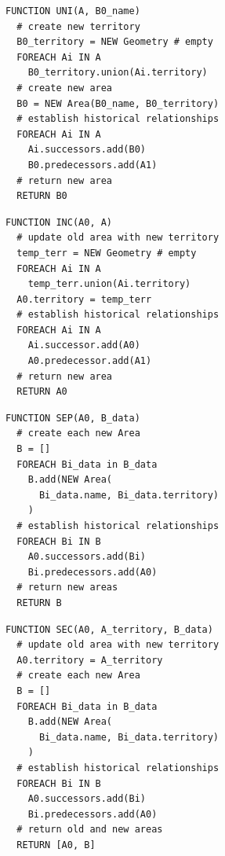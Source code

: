 \begin{minipage}[t]{0.47\textwidth}
\begin{lstlisting}[language=pseudocode,
  caption=Unification]
FUNCTION UNI(A, B0_name)
  # create new territory
  B0_territory = NEW Geometry # empty
  FOREACH Ai IN A
    B0_territory.union(Ai.territory)
  # create new area
  B0 = NEW Area(B0_name, B0_territory)
  # establish historical relationships
  FOREACH Ai IN A
    Ai.successors.add(B0)
    B0.predecessors.add(A1)
  # return new area
  RETURN B0
\end{lstlisting}
\end{minipage}    %
\hspace{3.0em}    %
\begin{minipage}[t]{0.47\textwidth}
\begin{lstlisting}[language=pseudocode,
  caption=Incorporation]
FUNCTION INC(A0, A)
  # update old area with new territory
  temp_terr = NEW Geometry # empty
  FOREACH Ai IN A
    temp_terr.union(Ai.territory)
  A0.territory = temp_terr
  # establish historical relationships
  FOREACH Ai IN A
    Ai.successor.add(A0)
    A0.predecessor.add(A1)
  # return new area
  RETURN A0
\end{lstlisting}
\end{minipage}

\begin{minipage}[t]{0.47\textwidth}
\begin{lstlisting}[language=pseudocode,
  caption=Separation]
FUNCTION SEP(A0, B_data)
  # create each new Area
  B = []
  FOREACH Bi_data in B_data
    B.add(NEW Area(
      Bi_data.name, Bi_data.territory)
    )
  # establish historical relationships
  FOREACH Bi IN B
    A0.successors.add(Bi)
    Bi.predecessors.add(A0)
  # return new areas
  RETURN B

\end{lstlisting}
\end{minipage}    %
\hspace{3.5em}    %
\begin{minipage}[t]{0.47\textwidth}
\begin{lstlisting}[language=pseudocode,
  caption=Secession]
FUNCTION SEC(A0, A_territory, B_data)
  # update old area with new territory
  A0.territory = A_territory
  # create each new Area
  B = []
  FOREACH Bi_data in B_data
    B.add(NEW Area(
      Bi_data.name, Bi_data.territory)
    )
  # establish historical relationships
  FOREACH Bi IN B
    A0.successors.add(Bi)
    Bi.predecessors.add(A0)
  # return old and new areas
  RETURN [A0, B]

\end{lstlisting}
\end{minipage}

